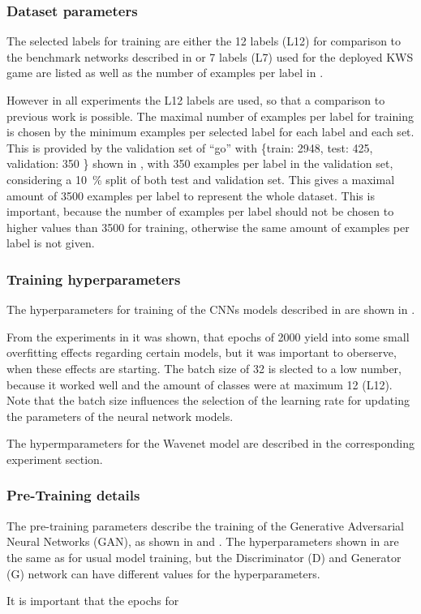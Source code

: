 \subsubsection{Dataset parameters}
The selected labels for training are either the 12 labels (L12) for comparison to the benchmark networks described in  or 7 labels (L7) used for the deployed KWS game are listed as well as the number of examples per label in .

However in all experiments the L12 labels are used, so that a comparison to previous work is possible.
The maximal number of examples per label for training is chosen by the minimum examples per selected label for each label and each set.
This is provided by the validation set of \enquote{go} with \{train: 2948, test: 425, validation: 350 \} shown in , with 350 examples per label in the validation set, considering a \SI{10}{\percent} split of both test and validation set.
This gives a maximal amount of 3500 examples per label to represent the whole dataset.
This is important, because the number of examples per label should not be chosen to higher values than 3500 for training, otherwise the same amount of examples per label is not given.



\subsubsection{Training hyperparameters}
The hyperparameters for training of the CNNs models described in  are shown in .

From the experiments in  it was shown, that epochs of 2000 yield into some small overfitting effects regarding certain models, but it was important to oberserve, when these effects are starting.
The batch size of 32 is slected to a low number, because it worked well and the amount of classes were at maximum 12 (L12).
Note that the batch size influences the selection of the learning rate for updating the parameters of the neural network models.

The hypermparameters for the Wavenet model are described in the corresponding experiment section.



\subsubsection{Pre-Training details}
The pre-training parameters describe the training of the Generative Adversarial Neural Networks (GAN), as shown in  and .
The hyperparameters shown in  are the same as for usual model training, but the Discriminator (D) and Generator (G) network can have different values for the hyperparameters.

It is important that the epochs for 


